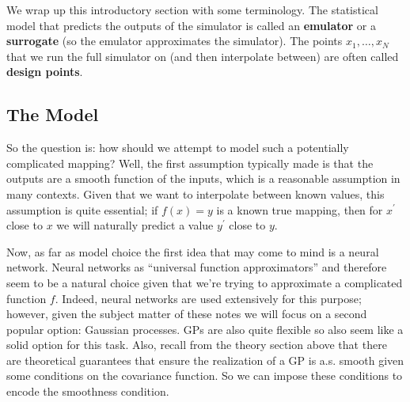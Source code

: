 \documentclass[12pt]{article}
\begin{document}
We wrap up this introductory section with some terminology. The statistical model that predicts the outputs of the simulator is called an \textbf{emulator} or a \textbf{surrogate}
(so the emulator approximates the simulator). The points $x_1, \dots, x_N$ that we run the full simulator on (and then interpolate between) are often called \textbf{design points}. 

\subsection{The Model}
So the question is: how should we attempt to model such a potentially complicated mapping? Well, the first assumption typically made is that the outputs are a smooth function
of the inputs, which is a reasonable assumption in many contexts. Given that we want to interpolate between known values, this assumption is quite essential; if $f(x) = y$ is a known 
true mapping, then for $x^\prime$ close to $x$ we will naturally predict a value $y^\prime$ close to $y$. 

Now, as far as model choice the first idea that may come to mind is a neural network. Neural networks as ``universal function approximators'' and therefore seem to be a natural choice
given that we're trying to approximate a complicated function $f$. Indeed, neural networks are used extensively for this purpose; however, given the subject matter of these notes we will 
focus on a second popular option: Gaussian processes. GPs are also quite flexible so also seem like a solid option for this task. Also, recall from the theory section above that there are 
theoretical guarantees that ensure the realization of a GP is a.s. smooth given some conditions on the covariance function. So we can impose these conditions to encode the smoothness 
condition. 
\end{document}
